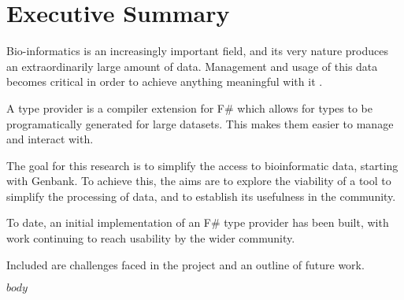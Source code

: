 \documentclass[a4paper,12pt]{article} %
\begin{document}
  
  \pagestyle{plain}
  \doublespacing

  \section*{Executive Summary}
  {\color{cyan}
    Bio-informatics is an increasingly important field, and its very nature
  produces an extraordinarily large amount of data. Management and usage of
  this data becomes critical in order to achieve anything meaningful with
  it \parencite{lee_bioinformatics_2012}.

  A type provider is a compiler extension for F\# which allows for types to be
  programatically generated for large datasets. This makes them easier to manage
  and interact with.
  }

  The goal for this research is to simplify the access to bioinformatic data,
  starting with Genbank.  To achieve this, the aims are to explore the
  viability of a tool to simplify the processing of data, and to establish its
  usefulness in the community.

  To date, an initial implementation of an F\# type provider has been built,
  with work continuing to reach usability by the wider community.

  Included are challenges faced in the project and an outline of future work.
  \newpage

  \singlespacing
  \tableofcontents

  \newpage
  \doublespacing
  \pagestyle{fancy} %
  \setcounter{page}{1}

	\titleformat{\section}[hang]{\Large\bfseries}{}{0ex}{}{} %

  $body$

  \newpage
  \printbibliography
\end{document}
